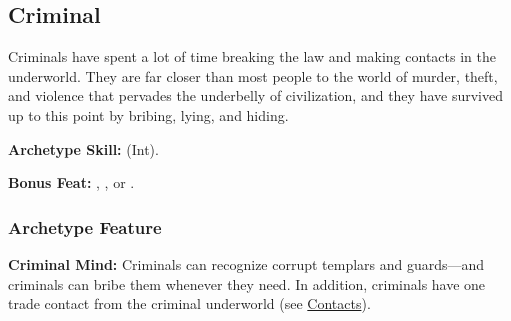 \subsection{Criminal}
Criminals have spent a lot of time breaking the law and making contacts in the underworld. They are far closer than most people to the world of murder, theft, and violence that pervades the underbelly of civilization, and they have survived up to this point by bribing, lying, and hiding.

\textbf{Archetype Skill:}  (Int).

\textbf{Bonus Feat:} , , or .

\subsubsection{Archetype Feature}
\textbf{Criminal Mind:} Criminals can recognize corrupt templars and guards---and criminals can bribe them whenever they need. In addition, criminals have one trade contact from the criminal underworld (see \hyperref[sec:contacts]{Contacts}).
